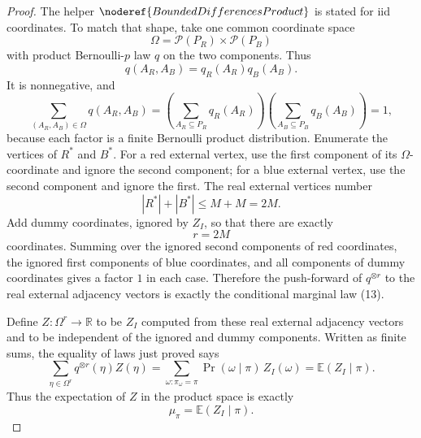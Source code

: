 \begin{proof}
The helper \(\noderef{BoundedDifferencesProduct}\) is stated for iid
coordinates.  To match that shape, take one common coordinate space
\[
\Omega=\mathcal P(P_R)\times\mathcal P(P_B)
\]
with product Bernoulli-\(p\) law \(q\) on the two components.  Thus
\[
q(A_R,A_B)=q_R(A_R)q_B(A_B).
\]
It is nonnegative, and
\[
\sum_{(A_R,A_B)\in\Omega}q(A_R,A_B)
=\left(\sum_{A_R\subseteq P_R}q_R(A_R)\right)
 \left(\sum_{A_B\subseteq P_B}q_B(A_B)\right)=1,
\]
because each factor is a finite Bernoulli product distribution.  Enumerate
the vertices of \(R^\ast\) and \(B^\ast\).  For a red external vertex, use the
first component of its \(\Omega\)-coordinate and ignore the second component;
for a blue external vertex, use the second component and ignore the first.
The real external vertices number
\[
|R^\ast|+|B^\ast|\le M+M=2M.
\]
Add dummy coordinates, ignored by \(Z_I\), so that there are exactly
\[
r=2M
\]
coordinates.  Summing over the ignored second components of red coordinates,
the ignored first components of blue coordinates, and all components of dummy
coordinates gives a factor \(1\) in each case.  Therefore the push-forward of
\(q^{\otimes r}\) to the real external adjacency vectors is exactly the
conditional marginal law (13).

Define \(Z:\Omega^r\to\mathbb R\) to be \(Z_I\) computed from these real
external adjacency vectors and to be independent of the ignored and dummy
components.  Written as finite sums, the equality of laws just proved says
\[
\sum_{\eta\in\Omega^r}q^{\otimes r}(\eta)Z(\eta)
=\sum_{\omega:\pi_\omega=\pi}
   \Pr(\omega\mid\pi)\,Z_I(\omega)
=\mathbb E(Z_I\mid\pi).
\]
Thus the expectation of \(Z\) in the product space is exactly
\[
\mu_\pi=\mathbb E(Z_I\mid\pi). \tag{14}
\]


\end{proof}
